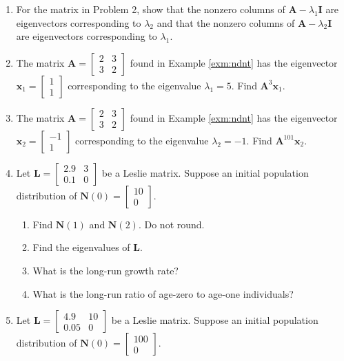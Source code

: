 \documentclass[
]{book}
\providecommand{\tightlist}{%
  \setlength{\itemsep}{0pt}\setlength{\parskip}{0pt}}
\theoremstyle{definition}
\theoremstyle{definition}
\theoremstyle{definition}
\theoremstyle{definition}
\theoremstyle{remark}
\begin{document}
\begin{enumerate}
\item
  For the matrix in Problem 2, show that the nonzero columns of \(\mathbf{A}-\lambda_1\mathbf{I}\) are eigenvectors corresponding to \(\lambda_2\) and that the nonzero columns of \(\mathbf{A}-\lambda_2\mathbf{I}\) are eigenvectors corresponding to \(\lambda_1.\)
\item
  The matrix \(\mathbf{A}=\begin{bmatrix}2 & 3\\3&2\end{bmatrix}\) found in Example \ref{exm:ndnt} has the eigenvector \(\mathbf{x}_1=\begin{bmatrix}1\\1\end{bmatrix}\) corresponding to the eigenvalue \(\lambda_1=5.\) Find \(\mathbf{A}^{3}\mathbf{x}_1.\)
\item
  The matrix \(\mathbf{A}=\begin{bmatrix}2 & 3\\3&2\end{bmatrix}\) found in Example \ref{exm:ndnt} has the eigenvector \(\mathbf{x}_2=\begin{bmatrix}-1\\1\end{bmatrix}\) corresponding to the eigenvalue \(\lambda_2=-1.\) Find \(\mathbf{A}^{101}\mathbf{x}_2.\)
\item
  Let \(\mathbf{L}=\begin{bmatrix} 2.9 & 3\\0.1 & 0\end{bmatrix}\) be a Leslie matrix. Suppose an initial population distribution of \(\mathbf{N}(0)=\begin{bmatrix}10 \\0\end{bmatrix}.\)

  \begin{enumerate}
  \def\labelenumii{\alph{enumii}.}
  \tightlist
  \item
    Find \(\mathbf{N}(1)\) and \(\mathbf{N}(2).\) Do not round.
  \item
    Find the eigenvalues of \(\mathbf{L}.\)
  \item
    What is the long-run growth rate?
  \item
    What is the long-run ratio of age-zero to age-one individuals?
  \end{enumerate}
\item
  Let \(\mathbf{L}=\begin{bmatrix} 4.9 & 10\\0.05 & 0\end{bmatrix}\) be a Leslie matrix. Suppose an initial population distribution of \(\mathbf{N}(0)=\begin{bmatrix}100 \\0\end{bmatrix}.\)


\end{enumerate}
\end{document}
